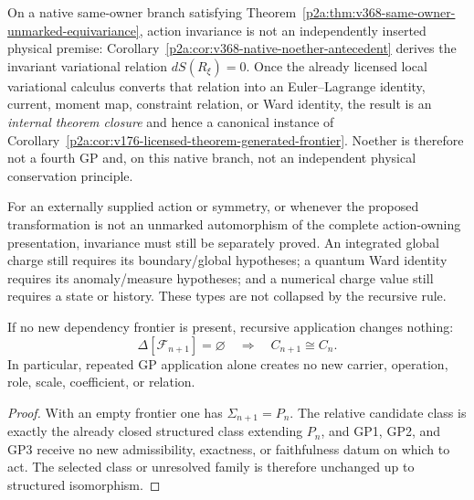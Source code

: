 \documentclass[12pt,a4paper]{article}
\begin{document}
\begin{remark}
\label{p2a:rem:v176-noether-not-gp4}
On a native same-owner branch satisfying
Theorem~\ref{p2a:thm:v368-same-owner-unmarked-equivariance}, action invariance
is not an independently inserted physical premise:
Corollary~\ref{p2a:cor:v368-native-noether-antecedent} derives the invariant
variational relation \(dS(R_\xi)=0\).  Once the already licensed local
variational calculus converts that relation into an Euler--Lagrange identity,
current, moment map, constraint relation, or Ward identity, the result is an
\emph{internal theorem closure} and hence a canonical instance of
Corollary~\ref{p2a:cor:v176-licensed-theorem-generated-frontier}.  Noether is
therefore not a fourth GP and, on this native branch, not an independent
physical conservation principle.

For an externally supplied action or symmetry, or whenever the proposed
transformation is not an unmarked automorphism of the complete action-owning
presentation, invariance must still be separately proved.  An integrated
global charge still requires its boundary/global hypotheses; a quantum Ward
identity requires its anomaly/measure hypotheses; and a numerical charge value
still requires a state or history.  These types are not collapsed by the
recursive rule.
\end{remark}


\begin{corollary}
\label{p2:cor:recursive-gp-fixed-point}
If no new dependency frontier is present, recursive application changes
nothing:
\[
   \Delta[\mathcal F_{n+1}]=\varnothing
   \quad\Longrightarrow\quad
   C_{n+1}\cong C_n.
\]
In particular, repeated GP application alone creates no new carrier, operation,
role, scale, coefficient, or relation.
\end{corollary}

\begin{proof}
With an empty frontier one has \(\Sigma_{n+1}=P_n\).  The relative candidate
class is exactly the already closed structured class extending \(P_n\), and
GP1, GP2, and GP3 receive no new admissibility, exactness, or faithfulness
datum on which to act.  The selected class or unresolved family is therefore
unchanged up to structured isomorphism.
\end{proof}
\end{document}
